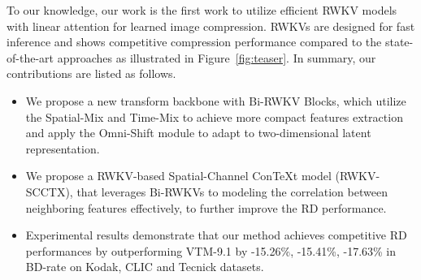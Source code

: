 To our knowledge, our work is the first work to utilize efficient RWKV models with linear attention for learned image compression. 
RWKVs are designed for fast inference and shows competitive compression performance compared to the state-of-the-art approaches as illustrated in Figure~\ref{fig:teaser}. In summary, our contributions are listed as follows.
%
\begin{itemize}
    \item We propose a new transform backbone with Bi-RWKV Blocks, which utilize the Spatial-Mix and Time-Mix to achieve more compact features extraction and apply the Omni-Shift module to adapt to two-dimensional latent representation.
    \item We propose a RWKV-based Spatial-Channel ConTeXt model (RWKV-SCCTX), that leverages Bi-RWKVs to modeling the correlation between neighboring features effectively, to further improve the RD performance.
    \item Experimental results demonstrate that our method achieves competitive RD performances by outperforming VTM-9.1 by -15.26\%, -15.41\%, -17.63\% in BD-rate on Kodak, CLIC and Tecnick datasets.
\end{itemize}







